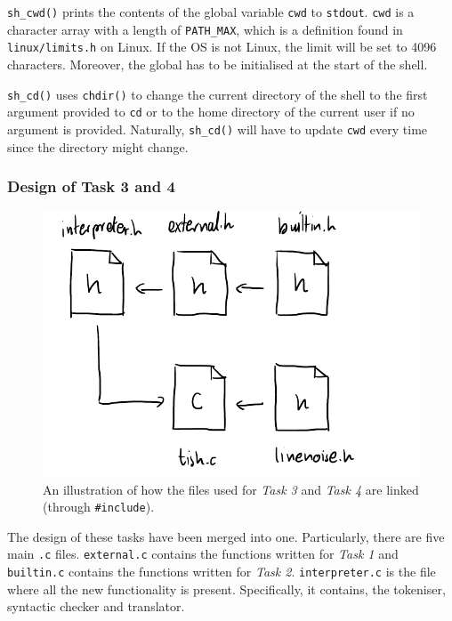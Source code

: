 \documentclass[12pt]{article}
\begin{document}


\newpage



\texttt{sh\_cwd()} prints the contents of the global variable
\texttt{cwd} to \texttt{stdout}. \texttt{cwd} is a character
array with a length of \texttt{PATH\_MAX}, which is a definition
found in \texttt{linux/limits.h} on Linux. If the OS is not
Linux, the limit will be set to 4096 characters. Moreover, the
global has to be initialised at the start of the shell.

\texttt{sh\_cd()} uses \texttt{chdir()} to change the current
directory of the shell to the first argument provided to
\texttt{cd} or to the home directory of the current user if no
argument is provided. Naturally, \texttt{sh\_cd()} will have to
update \texttt{cwd} every time since the directory might change.

\subsubsection{Design of Task 3 and 4}

\begin{figure}[H]
\centering
\includegraphics{task3arch}
\caption{An illustration of how the files used for \textit{Task
3} and \textit{Task 4} are linked (through \texttt{\#include}).}
\end{figure}

The design of these tasks have been merged into one.
Particularly, there are five main \texttt{.c} files.
\texttt{external.c} contains the functions written for
\textit{Task 1} and \texttt{builtin.c} contains the functions
written for \textit{Task 2}. \texttt{interpreter.c} is the file
where all the new functionality is present. Specifically, it
contains, the tokeniser, syntactic checker and translator.
\end{document}

